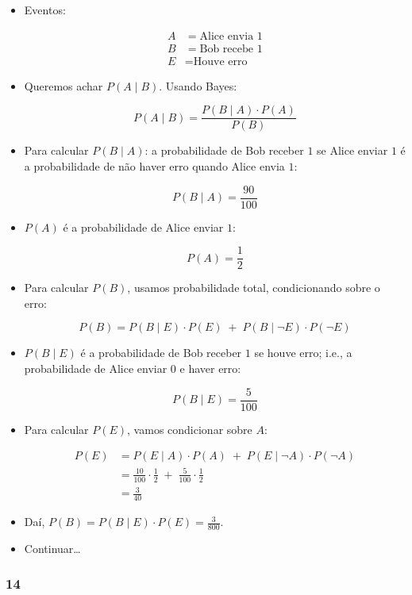 \documentclass[
  11pt]{report}
\begin{document}
\begin{itemize}
\item
  Eventos:

  \[
  \begin{aligned}
  A &= \text{Alice envia } 1 \\
  B &= \text{Bob recebe } 1 \\
  E &= \text{Houve erro}
  \end{aligned}
  \]
\item
  Queremos achar $P(A \mid B)$. Usando Bayes:

  \[
  P(A \mid B) = \frac{P(B \mid A) \cdot P(A)}{P(B)}
  \]
\item
  Para calcular $P(B \mid A)$: a probabilidade de Bob receber $1$ se Alice enviar $1$ é a probabilidade de não haver erro quando Alice envia $1$:

  \[P(B \mid A) = \frac{90}{100}\]
\item
  $P(A)$ é a probabilidade de Alice enviar $1$:

  \[P(A) = \frac12\]
\item
  Para calcular $P(B)$, usamos probabilidade total, condicionando sobre o erro:

  \[
  P(B) = P(B \mid E) \cdot P(E) \;+\;
  P(B \mid \neg E) \cdot P(\neg E)
  \]
\item
  $P(B \mid E)$ é a probabilidade de Bob receber $1$ se houve erro; i.e., a probabilidade de Alice enviar $0$ e haver erro:

  \[P(B \mid E) = \frac{5}{100}\]
\item
  Para calcular $P(E)$, vamos condicionar sobre $A$:

  \[
  \begin{aligned}
  P(E) 
  &=
  P(E \mid A) \cdot P(A) \;+\;
  P(E \mid \neg A) \cdot P(\neg A) \\
  &=
  \frac{10}{100} \cdot \frac12 \;+\;
  \frac{5}{100} \cdot \frac12 \\
  &= \frac{3}{40}
  \end{aligned}
  \]
\item
  Daí, $P(B) = P(B \mid E) \cdot P(E) = \frac{3}{800}$.
\item
  Continuar\ldots{}
\end{itemize}

\hypertarget{section-13}{%
\subsubsection*{14}\label{section-13}}
\end{document}
